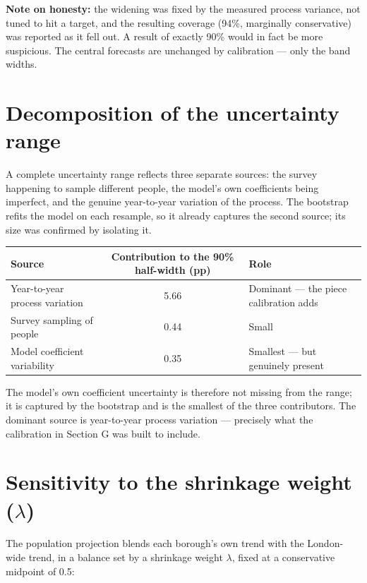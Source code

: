 \documentclass[ %
                    author={Ashrey Ashrey, Sanya Kapoor, Trisha Sharma, Yash Bhooshan Pandloskar},
                supervisor={Dr. Dalila O’Grady},
                    degree={MSc},
                     title={Using machine learning to forecast physical activity participation, volunteering and activity patterns in London},
                  subtitle={},
                      type={},
                      year={2021}]{dissertation}
\begin{document}
\noindent
\textbf{Note on honesty:} the widening was fixed by the measured process variance, not tuned to hit a target, and the resulting coverage (94\%, marginally conservative) was reported as it fell out. A result of exactly 90\% would in fact be more suspicious. The central forecasts are unchanged by calibration --- only the band widths.

\section{Decomposition of the uncertainty range}

\noindent
A complete uncertainty range reflects three separate sources: the survey happening to sample different people, the model's own coefficients being imperfect, and the genuine year-to-year variation of the process. The bootstrap refits the model on each resample, so it already captures the second source; its size was confirmed by isolating it.

\begin{table}[!htb]
\centering
\begin{tabularx}{\textwidth}{@{}XcX@{}}
\toprule
\textbf{Source} & \textbf{Contribution to the 90\% half-width (pp)} & \textbf{Role} \\
\midrule
Year-to-year process variation & 5.66 & Dominant --- the piece calibration adds \\
Survey sampling of people & 0.44 & Small \\
Model coefficient variability & 0.35 & Smallest --- but genuinely present \\
\bottomrule
\end{tabularx}
\end{table}

The model's own coefficient uncertainty is therefore not missing from the range; it is captured by the bootstrap and is the smallest of the three contributors. The dominant source is year-to-year process variation --- precisely what the calibration in Section G was built to include.

\section{Sensitivity to the shrinkage weight (\texorpdfstring{\(\lambda\)}{lambda})}

\noindent
The population projection blends each borough's own trend with the London-wide trend, in a balance set by a shrinkage weight \(\lambda\), fixed at a conservative midpoint of 0.5:
\end{document}
